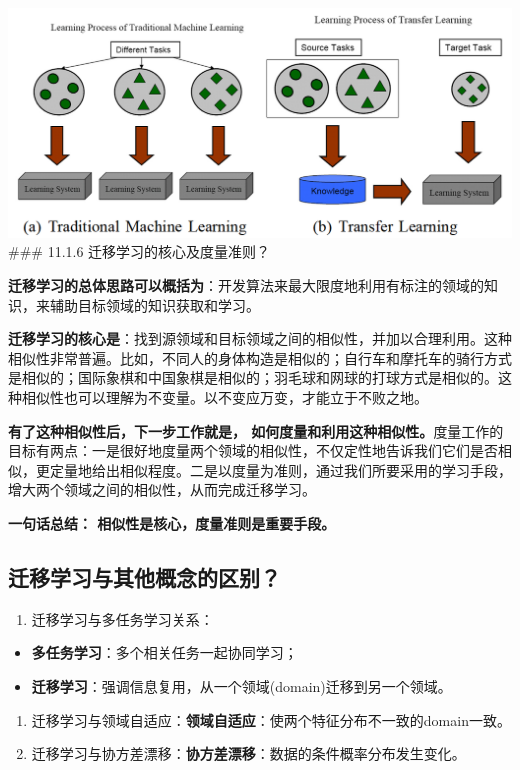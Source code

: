\includegraphics{./img/ch11/1542973960796.png} \#\#\# 11.1.6
迁移学习的核心及度量准则？

\textbf{迁移学习的总体思路可以概括为}：开发算法来最大限度地利用有标注的领域的知识，来辅助目标领域的知识获取和学习。

\textbf{迁移学习的核心是}：找到源领域和目标领域之间的相似性，并加以合理利用。这种相似性非常普遍。比如，不同人的身体构造是相似的；自行车和摩托车的骑行方式是相似的；国际象棋和中国象棋是相似的；羽毛球和网球的打球方式是相似的。这种相似性也可以理解为不变量。以不变应万变，才能立于不败之地。

\textbf{有了这种相似性后，下一步工作就是，
如何度量和利用这种相似性。}度量工作的目标有两点：一是很好地度量两个领域的相似性，不仅定性地告诉我们它们是否相似，更定量地给出相似程度。二是以度量为准则，通过我们所要采用的学习手段，增大两个领域之间的相似性，从而完成迁移学习。

\textbf{一句话总结： 相似性是核心，度量准则是重要手段。}

\subsection{迁移学习与其他概念的区别？}\label{ux8fc1ux79fbux5b66ux4e60ux4e0eux5176ux4ed6ux6982ux5ff5ux7684ux533aux522b}

\begin{enumerate}
\def\labelenumi{\arabic{enumi}.}
\tightlist
\item
  迁移学习与多任务学习关系：
\end{enumerate}

\begin{itemize}
\tightlist
\item
  \textbf{多任务学习}：多个相关任务一起协同学习；
\item
  \textbf{迁移学习}：强调信息复用，从一个领域(domain)迁移到另一个领域。
\end{itemize}

\begin{enumerate}
\def\labelenumi{\arabic{enumi}.}
\setcounter{enumi}{1}
\tightlist
\item
  迁移学习与领域自适应：\textbf{领域自适应}：使两个特征分布不一致的domain一致。
\item
  迁移学习与协方差漂移：\textbf{协方差漂移}：数据的条件概率分布发生变化。
\end{enumerate}

